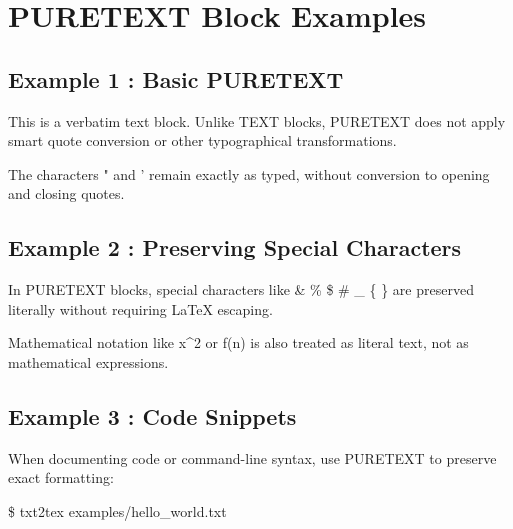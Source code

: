 \documentclass[a4paper,10pt,fleqn]{article}
\begin{document}
\section*{PURETEXT Block Examples}

\subsection*{Example 1 : Basic PURETEXT}

\bigskip

This is a verbatim text block. Unlike TEXT blocks, PURETEXT does not apply smart quote conversion or other typographical transformations.

\bigskip

\bigskip

The characters " and ' remain exactly as typed, without conversion to opening and closing quotes.

\bigskip

\subsection*{Example 2 : Preserving Special Characters}

\bigskip

In PURETEXT blocks, special characters like \& \% \$ \# \_ \{ \} are preserved literally without requiring LaTeX escaping.

\bigskip

\bigskip

Mathematical notation like x\textasciicircum{}2 or f(n) is also treated as literal text, not as mathematical expressions.

\bigskip

\subsection*{Example 3 : Code Snippets}

\bigskip

When documenting code or command-line syntax, use PURETEXT to preserve exact formatting:

\bigskip

\bigskip

\$ txt2tex examples/hello\_world.txt
\end{document}
